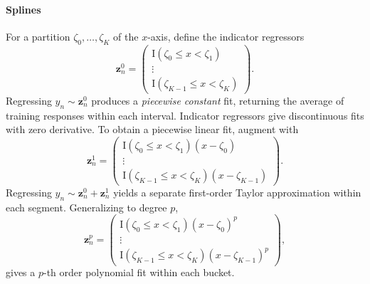 \paragraph{Splines}
For a partition $\zeta_0, \ldots, \zeta_K$ of the $x$-axis, define the indicator regressors
\[
\mathbf{z}_n^0 = \begin{pmatrix}
\mathrm{I}(\zeta_0 \leq x < \zeta_1) \\
\vdots \\
\mathrm{I}(\zeta_{K-1} \leq x < \zeta_K)
\end{pmatrix}.
\]
Regressing $y_n \sim \mathbf{z}_n^0$ produces a \emph{piecewise constant} fit, returning the average of training responses within each interval.
Indicator regressors give discontinuous fits with zero derivative. To obtain a piecewise linear fit, augment with
\[
\mathbf{z}_n^1 = \begin{pmatrix}
\mathrm{I}(\zeta_0 \leq x < \zeta_1)(x - \zeta_0) \\
\vdots \\
\mathrm{I}(\zeta_{K-1} \leq x < \zeta_K)(x - \zeta_{K-1})
\end{pmatrix}.
\]
Regressing $y_n \sim \mathbf{z}_n^0 + \mathbf{z}_n^1$ yields a separate first-order Taylor approximation within each segment.
Generalizing to degree $p$,
\[
\mathbf{z}_n^p = \begin{pmatrix}
\mathrm{I}(\zeta_0 \leq x < \zeta_1)(x - \zeta_0)^p \\
\vdots \\
\mathrm{I}(\zeta_{K-1} \leq x < \zeta_K)(x - \zeta_{K-1})^p
\end{pmatrix},
\]
gives a $p$-th order polynomial fit within each bucket.

